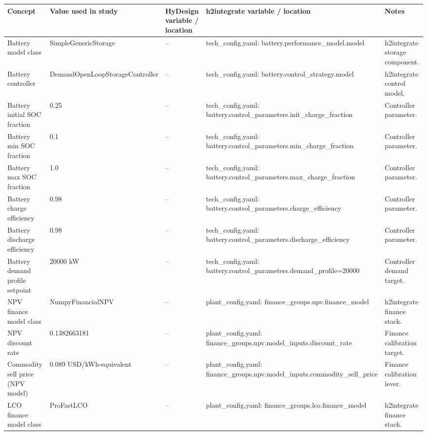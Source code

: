 \begin{center}
\footnotesize
\setlength{\tabcolsep}{4pt}
\renewcommand{\arraystretch}{1.22}
\begin{tabular}{L{0.16\textwidth} L{0.14\textwidth} L{0.22\textwidth} L{0.22\textwidth} L{0.20\textwidth}}
\hline
Concept & Value used in study & HyDesign variable / location & h2integrate variable / location & Notes \\
\hline
Battery model class & SimpleGenericStorage & -- & tech\_config.yaml: battery.performance\_model.model & h2integrate storage component. \\
Battery controller & DemandOpenLoopStorageController & -- & tech\_config.yaml: battery.control\_strategy.model & h2integrate control model. \\
Battery initial SOC fraction & 0.25 & -- & tech\_config.yaml: battery.control\_parameters.init\_charge\_fraction & Controller parameter. \\
Battery min SOC fraction & 0.1 & -- & tech\_config.yaml: battery.control\_parameters.min\_charge\_fraction & Controller parameter. \\
Battery max SOC fraction & 1.0 & -- & tech\_config.yaml: battery.control\_parameters.max\_charge\_fraction & Controller parameter. \\
Battery charge efficiency & 0.98 & -- & tech\_config.yaml: battery.control\_parameters.charge\_efficiency & Controller parameter. \\
Battery discharge efficiency & 0.98 & -- & tech\_config.yaml: battery.control\_parameters.discharge\_efficiency & Controller parameter. \\
Battery demand profile setpoint & 20000 kW & -- & tech\_config.yaml: battery.control\_parameters.demand\_profile=20000 & Controller demand target. \\
NPV finance model class & NumpyFinancialNPV & -- & plant\_config.yaml: finance\_groups.npv.finance\_model & h2integrate finance stack. \\
NPV discount rate & 0.1382663181 & -- & plant\_config.yaml: finance\_groups.npv.model\_inputs.discount\_rate & Finance calibration target. \\
Commodity sell price (NPV model) & 0.089 USD/kWh-equivalent & -- & plant\_config.yaml: finance\_groups.npv.model\_inputs.commodity\_sell\_price & Finance calibration lever. \\
LCO finance model class & ProFastLCO & -- & plant\_config.yaml: finance\_groups.lco.finance\_model & h2integrate finance stack. \\

\end{tabular}
\end{center}

